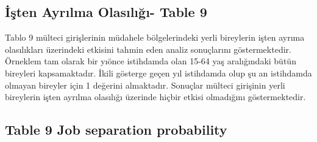 \documentclass{article}
\begin{document}
\newpage
    \subsection*{İşten Ayrılma Olasılığı- Table 9}
Tablo 9 mülteci girişlerinin müdahele bölgelerindeki yerli bireylerin işten ayrıma olasılıkları üzerindeki etkisini tahmin eden analiz sonuçlarını göstermektedir. Örneklem tam olarak bir yıönce istihdamda olan 15-64 yaş aralığındaki bütün bireyleri kapsamaktadır. İkili gösterge geçen yıl istihdamda olup şu an istihdamda olmayan bireyler için 1 değerini almaktadır. Sonuçlar mülteci girişinin yerli bireylerin işten ayrılma olasılığı üzerinde hiçbir etkisi olmadığını göstermektedir. 
\subsection*{Table 9 Job separation probability}
\end{document}
